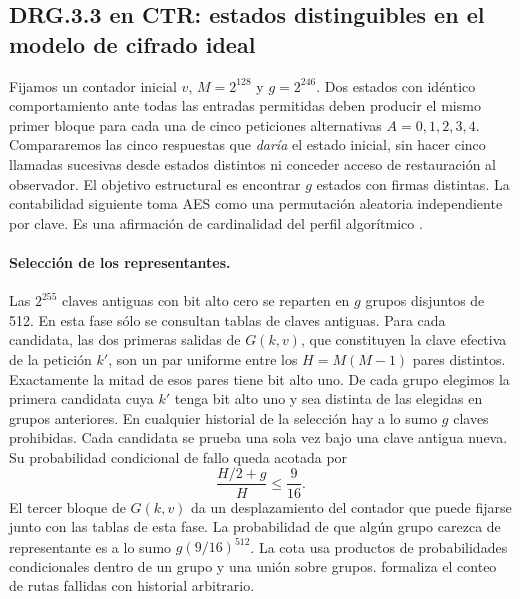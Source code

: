 \subsection{DRG.3.3 en CTR: estados distinguibles en el modelo de cifrado ideal}
\label{sec:ctr-effective-struct}
Fijamos un contador inicial \(v\), \(M=2^{128}\) y \(g=2^{246}\).
Dos estados con idéntico comportamiento ante todas las entradas permitidas
deben producir el mismo primer bloque para cada una de cinco peticiones
alternativas \(A=0,1,2,3,4\). Compararemos las cinco respuestas que
\emph{daría} el estado inicial, sin hacer cinco llamadas sucesivas desde
estados distintos ni conceder acceso de restauración al observador.
El objetivo estructural es encontrar \(g\) estados con firmas distintas.
La contabilidad siguiente toma AES como una permutación aleatoria
independiente por clave. Es una afirmación de cardinalidad del perfil
algorítmico \cite[§§91--103, 115, 207 y 1007]{ais}.

\paragraph{Selección de los representantes.}
Las \(2^{255}\) claves antiguas con bit alto cero se reparten en \(g\)
grupos disjuntos de 512. En esta fase sólo se consultan tablas de claves
antiguas. Para cada candidata, las dos primeras salidas de
\(G(k,v)\), que constituyen la clave efectiva de la petición \(k'\),
son un par uniforme entre los \(H=M(M-1)\) pares distintos.
Exactamente la mitad de esos pares tiene bit alto uno.
De cada grupo elegimos la primera candidata cuya \(k'\) tenga bit alto
uno y sea distinta de las elegidas en grupos anteriores.
En cualquier historial de la selección hay a lo sumo \(g\) claves
prohibidas. Cada candidata se prueba una sola vez bajo una clave antigua
nueva. Su probabilidad condicional de fallo queda acotada por
\[
   \frac{H/2+g}{H}\le\frac9{16}.
\] El tercer bloque de \(G(k,v)\) da un desplazamiento
del contador que puede fijarse junto con las tablas de esta fase.
La probabilidad de que algún grupo carezca de representante es a lo sumo
\(g(9/16)^{512}\). La cota usa productos de probabilidades condicionales
dentro de un grupo y una unión sobre grupos.
 formaliza
el conteo de rutas fallidas con historial arbitrario.

